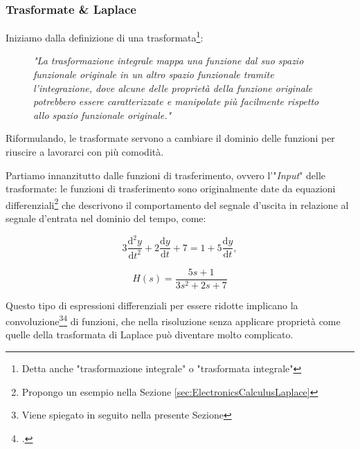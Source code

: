 \documentclass[a4paper, 10pt, final]{article} %
\newcommand{\parenciteit}[2]{\textit{\parencite[#1]{#2}}} %
\begin{document}
    \begin{samepage}%
        \subsubsection{Trasformate \& Laplace} \label{sec:TransformsAndLaplace}
        Iniziamo dalla definizione di una trasformata\footnote{Detta anche "trasformazione integrale" o "trasformata integrale"}: \nopagebreak
        \begin{figure}[H]
            \Centering
            \vspace{1ex}
            \textit{"La trasformazione integrale mappa una funzione dal suo spazio funzionale originale in un altro spazio funzionale tramite l'integrazione, dove alcune delle proprietà della funzione originale potrebbero essere caratterizzate e manipolate più facilmente rispetto allo spazio funzionale originale." }

            \RaggedLeft
            \vspace{1ex}

            \scriptsize{\parenciteit{}{Transform:Wiki}}
            \vspace{1ex}
        \end{figure}
        \noindent Riformulando, le trasformate servono a cambiare il dominio delle funzioni per riuscire a lavorarci con pi\`{u} comodit\`{a}.
    \end{samepage}%

    \begin{samepage}%
        Partiamo innanzitutto dalle funzioni di trasferimento, ovvero l'"\emph{Input}" delle trasformate: le funzioni di trasferimento sono originalmente date da equazioni differenziali\footnote{Propongo un esempio nella Sezione \ref{sec:ElectronicsCalculusLaplace}} che descrivono il comportamento del segnale d'uscita in relazione al segnale d'entrata nel dominio del tempo, come:
        \begin{figure}[H]
            \centering
            \begin{minipage}[b]{.3\linewidth}
                \centering
                \[
                    3\frac{\mathrm{d}^2y}{\mathrm{d}t^2} + 2\frac{\mathrm{d}y}{\mathrm{d}t} + 7 = 1 + 5\frac{\mathrm{d}y}{\mathrm{d}t} \mathrm{,}
                \]
            \end{minipage}
            \hspace{0.04\linewidth}
            \begin{minipage}[b]{.3\linewidth}
                \centering
                \[
                    H(s) = \frac{5s + 1}{3s^2 + 2s + 7}
                \]
            \end{minipage}
        \end{figure}
        \noindent Questo tipo di espressioni differenziali per essere ridotte implicano la convoluzione\footnote{Viene spiegato in seguito nella presente Sezione}\:\footcite[]{Convolution:Wiki} di funzioni, che nella risoluzione senza applicare propriet\`{a} come quelle della trasformata di Laplace pu\`{o} diventare molto complicato.
    \end{samepage}%
\end{document}
